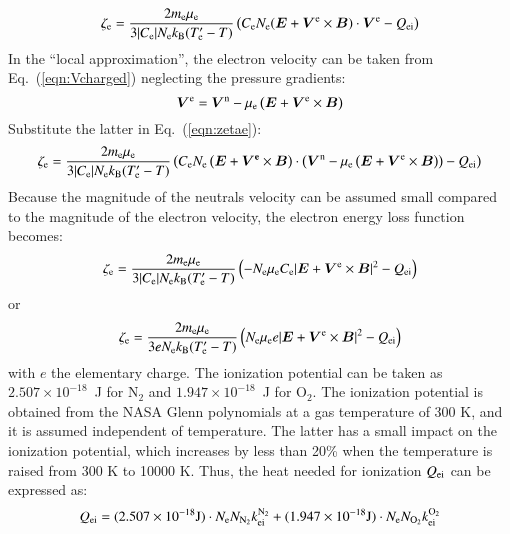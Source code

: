 \documentclass{warpdoc}
\newcommand{\mfd}{\displaystyle}
\renewcommand{\vec}[1]{\bm{#1}}
\let\citen\cite
\begin{document}
%
\begin{equation}
  \zeta_{\rm e}   
=  
 \frac{2 m_{\rm e} \mu_{\rm e}}{3 |C_{\rm e}| N_{\rm e} k_{\rm B} (T_{\rm e}^\prime-T) }
\left(  C_{\rm e} N_{\rm e} (\vec{E}+\vec{V}^{\rm e}\times\vec{B}) \cdot \vec{V}^{\rm e}
 - Q_{\rm ei}\right)
\label{eqn:zetae}
 \end{equation}
%
In the ``local approximation'',  the electron velocity can be taken from Eq.\ (\ref{eqn:Vcharged}) neglecting the pressure gradients:
%
\begin{equation}
  \vec{V}^{\rm e}=\vec{V}^{\rm n} - \mu_{\rm e} \left(\vec{E}+\vec{V}^{\rm e} \times \vec{B}\right)
\label{eqn:zetae_Ve}
\end{equation}
% 
Substitute the latter in Eq.\ (\ref{eqn:zetae}):
%
\begin{equation}
  \zeta_{\rm e}  
=  
 \frac{2 m_{\rm e} \mu_{\rm e}}{3 |C_{\rm e}| N_{\rm e} k_{\rm B} (T_{\rm e}^\prime-T) }
\left( C_{\rm e} N_{\rm e} \left(\vec{E} + \vec{V^{\rm e}} \times \vec{B}\right)\cdot \left(\vec{V}^{\rm n} - \mu_{\rm e} \left(\vec{E}+\vec{V}^{\rm e} \times \vec{B}\right)\right)
 - Q_{\rm ei}\right)
 \end{equation}
%
Because the magnitude of the neutrals velocity can be assumed small compared to the magnitude of the electron velocity, the electron energy loss function becomes:
%
\begin{equation}
  \zeta_{\rm e}  
=  
 \frac{2 m_{\rm e} \mu_{\rm e}}{3 |C_{\rm e}| N_{\rm e} k_{\rm B} (T_{\rm e}^\prime-T) }
\left(  -N_{\rm e} \mu_{\rm e} C_{\rm e} |\vec{E}+\vec{V}^{\rm e}\times \vec{B}|^2
 - Q_{\rm ei}\right)
 \end{equation}
%
or
%
\begin{equation}
  \zeta_{\rm e}  
=  
 \frac{2 m_{\rm e} \mu_{\rm e}}{3 e N_{\rm e} k_{\rm B} (T_{\rm e}^\prime-T) }
\left(  N_{\rm e} \mu_{\rm e} e |\vec{E}+\vec{V}^{\rm e}\times \vec{B}|^2
 - Q_{\rm ei}\right)
 \end{equation}
%
with $e$ the elementary charge. The ionization potential  can be taken as $2.507 \times 10^{-18}$~J for N$_2$ and $1.947 \times 10^{-18}$~J for O$_2$. The ionization potential is obtained from the NASA Glenn polynomials \citen{nasa:2002:mcbride} at a gas temperature of 300 K, and it is assumed independent of temperature. The latter has a small impact on the ionization potential, which increases by less than 20\% when the temperature is raised from 300 K to 10000 K. Thus, the heat needed for ionization $Q_{\rm ei}$ can be expressed as:
%
\begin{equation} 
 \begin{array}{r}\mfd
 Q_{\rm ei}= (2.507 \times 10^{-18} {\rm J}) \cdot N_{\rm e} N_{\rm N_2} k_{\rm ei}^{\rm N_2}
           + (1.947 \times 10^{-18} {\rm J}) \cdot  N_{\rm e} N_{\rm O_2} k_{\rm ei}^{\rm O_2}
 \end{array}
\end{equation}
\end{document}
